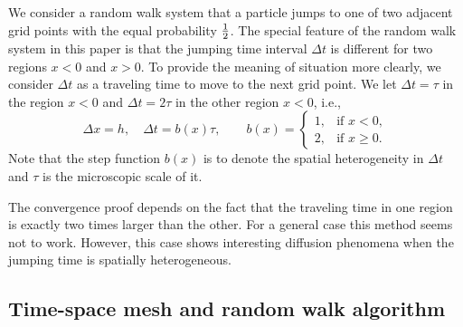 \documentclass[11pt]{amsart}
\begin{document}
We consider a random walk system that a particle jumps to one of two adjacent grid points with the equal probability ${1\over2}$. The special feature of the random walk system in this paper is that the jumping time interval $\Delta t$ is different for two regions $x<0$ and $x>0$. To provide the meaning of situation more clearly, we consider $\Delta t$ as a traveling time to move to the next grid point. We let $\Delta t=\tau$ in the region $x<0$ and $\Delta t=2\tau$ in the other region $x<0$, i.e.,
\begin{equation}\label{alpha}
\Delta x=h,\quad
\Delta t= b(x)\tau,\qquad
 b(x) =
\left\{\begin{array}{ll}
        1, & \text{if } x<0,\\
        2, & \text{if } x\ge0.
        \end{array}\right.
\end{equation}
Note that the step function $b(x)$ is to denote the spatial heterogeneity in $\Delta t$ and $\tau$ is the microscopic scale of it.

The convergence proof depends on the fact that the traveling time in one region is exactly two times larger than the other. For a general case this method seems not to work. However, this case shows interesting diffusion phenomena when the jumping time is spatially heterogeneous.

\subsection{Time-space mesh and random walk algorithm}
\end{document}
